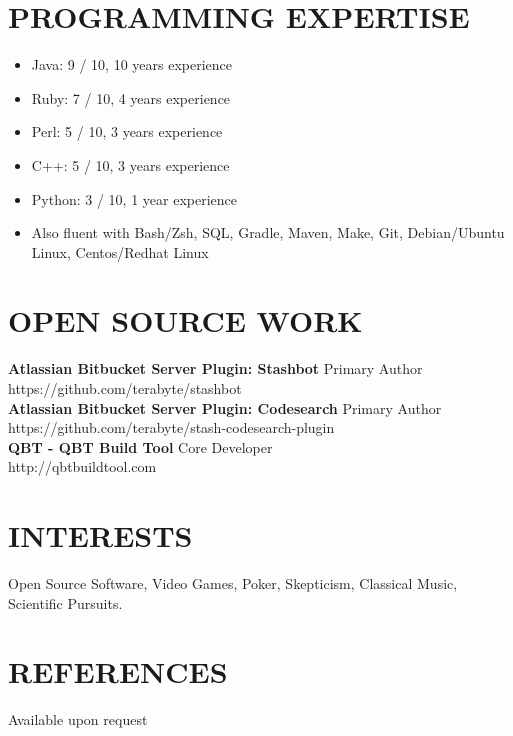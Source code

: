 \documentclass[line, margin]{res}
\begin{document}
\begin{resume}
\section{PROGRAMMING EXPERTISE}
\begin{itemize}
\item 
Java: 9 / 10, 10 years experience
\item 
Ruby: 7 / 10, 4 years experience
\item
Perl: 5 / 10, 3 years experience
\item
C++: 5 / 10, 3 years experience
\item
Python: 3 / 10, 1 year experience
\item
Also fluent with Bash/Zsh, SQL, Gradle, Maven, Make, Git, Debian/Ubuntu Linux, Centos/Redhat Linux
\end{itemize}

\section{OPEN SOURCE WORK}
{\bf Atlassian Bitbucket Server Plugin: Stashbot} \hfill Primary Author
\\
https://github.com/terabyte/stashbot
\\
{\bf Atlassian Bitbucket Server Plugin: Codesearch} \hfill Primary Author
\\
https://github.com/terabyte/stash-codesearch-plugin
\\
{\bf QBT - QBT Build Tool} \hfill Core Developer
\\
http://qbtbuildtool.com
\\

\section{INTERESTS} 
Open Source Software, Video Games, Poker, Skepticism, Classical Music, Scientific Pursuits.

\section{REFERENCES}
Available upon request

\end{resume}
\end{document}
